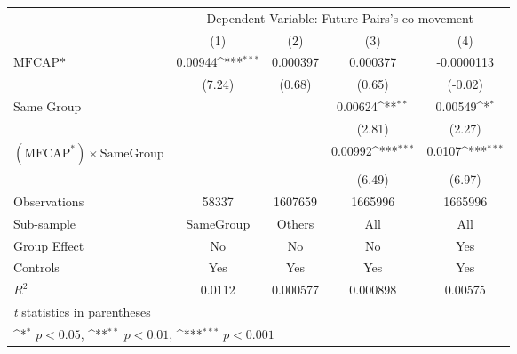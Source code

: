 {
\def\sym#1{\ifmmode^{#1}\else\(^{#1}\)\fi}
\begin{tabular}{l*{4}{c}}
\hline\hline
                &\multicolumn{4}{c}{Dependent Variable: Future Pairs's co-movement}         \\\cmidrule(lr){2-5}
                &\multicolumn{1}{c}{(1)}         &\multicolumn{1}{c}{(2)}         &\multicolumn{1}{c}{(3)}         &\multicolumn{1}{c}{(4)}         \\
\hline
$ \text{MFCAP*} $&  0.00944\sym{***}& 0.000397         & 0.000377         &-0.0000113         \\
                &   (7.24)         &   (0.68)         &   (0.65)         &  (-0.02)         \\
[1em]
Same Group      &                  &                  &  0.00624\sym{**} &  0.00549\sym{*}  \\
                &                  &                  &   (2.81)         &   (2.27)         \\
[1em]
 $ (\text{MFCAP}^*) \times {\text{SameGroup} }  $ &                  &                  &  0.00992\sym{***}&   0.0107\sym{***}\\
                &                  &                  &   (6.49)         &   (6.97)         \\
\hline
Observations    &    58337         &  1607659         &  1665996         &  1665996         \\
Sub-sample      &SameGroup         &   Others         &      All         &      All         \\
Group Effect    &       No         &       No         &       No         &      Yes         \\
Controls        &      Yes         &      Yes         &      Yes         &      Yes         \\
$ R^2 $         &   0.0112         & 0.000577         & 0.000898         &  0.00575         \\
\hline\hline
\multicolumn{5}{l}{\footnotesize \textit{t} statistics in parentheses}\\
\multicolumn{5}{l}{\footnotesize \sym{*} \(p<0.05\), \sym{**} \(p<0.01\), \sym{***} \(p<0.001\)}\\
\end{tabular}
}
